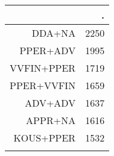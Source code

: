 \begin{tabular}{rr}
  \lsptoprule
 & . \\ 
  \midrule
DDA+NA & 2250 \\ 
  PPER+ADV & 1995 \\ 
  VVFIN+PPER & 1719 \\ 
  PPER+VVFIN & 1659 \\ 
  ADV+ADV & 1637 \\ 
  APPR+NA & 1616 \\ 
  KOUS+PPER & 1532 \\ 
   \lspbottomrule
\end{tabular}
